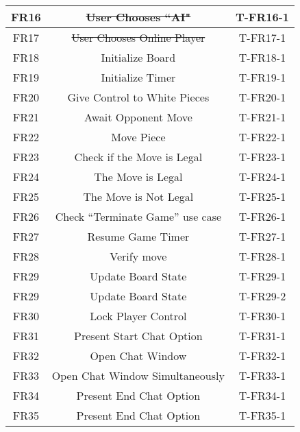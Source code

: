 \documentclass[12pt, titlepage]{article}
\begin{document}
\begin{center}
\begin{longtable}{ |c|c|c| }
        \hline
        FR16    & \sout{User Chooses ``AI"}                      & T-FR16-1 \\ 
        \hline
        FR17    & \sout{User Chooses Online Player}                       & T-FR17-1 \\ 
        \hline
        FR18    & Initialize Board          & T-FR18-1 \\ 
        \hline
        FR19    & Initialize Timer                   & T-FR19-1 \\ 
        \hline
        FR20    & Give Control to White Pieces                            & T-FR20-1 \\ 
        \hline
        FR21    & Await Opponent Move                & T-FR21-1 \\ 
        \hline
        FR22    & Move Piece                        & T-FR22-1 \\ 
        \hline
        FR23    & Check if the Move is Legal                     & T-FR23-1 \\ 
        \hline
        FR24    & The Move is Legal                 & T-FR24-1 \\ 
        \hline
        FR25    & The Move is Not Legal                     & T-FR25-1 \\ 
        \hline
        FR26    & Check “Terminate Game” use case                         & T-FR26-1 \\ 
        \hline
        FR27    & Resume Game Timer                    & T-FR27-1 \\ 
        \hline
        FR28    & Verify move                  & T-FR28-1 \\
        \hline
        FR29    & Update Board State             & T-FR29-1 \\ 
        FR29    & Update Board State             & T-FR29-2 \\ 
        \hline
        FR30    & Lock Player Control                      & T-FR30-1 \\ 
        \hline
        FR31    & Present Start Chat Option       & T-FR31-1 \\ 
        \hline
        FR32    & Open Chat Window              & T-FR32-1 \\ 
        \hline
        FR33    & Open Chat Window Simultaneously               & T-FR33-1 \\ 
        \hline
        FR34    & Present End Chat Option                     & T-FR34-1 \\ 
        \hline
        FR35    & Present End Chat Option      & T-FR35-1 \\ 

\end{longtable}
\end{center}
\end{document}
